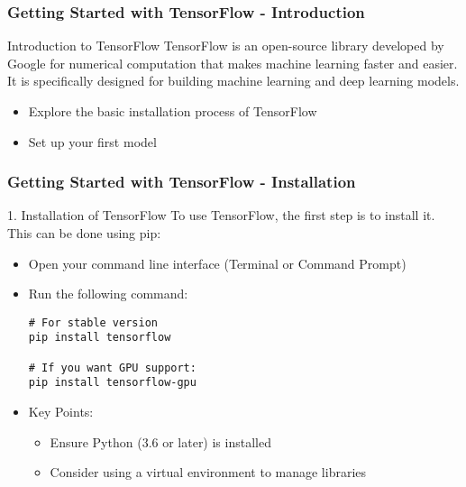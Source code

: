 \documentclass{beamer}
\begin{document}
\begin{frame}[fragile]
    \frametitle{Getting Started with TensorFlow - Introduction}
    \begin{block}{Introduction to TensorFlow}
        TensorFlow is an open-source library developed by Google for numerical computation that makes machine learning faster and easier. It is specifically designed for building machine learning and deep learning models.
    \end{block}
    \begin{itemize}
        \item Explore the basic installation process of TensorFlow
        \item Set up your first model
    \end{itemize}
\end{frame}

\begin{frame}[fragile]
    \frametitle{Getting Started with TensorFlow - Installation}
    \begin{block}{1. Installation of TensorFlow}
        To use TensorFlow, the first step is to install it. This can be done using pip:
    \end{block}
    \begin{itemize}
        \item Open your command line interface (Terminal or Command Prompt)
        \item Run the following command:
            \begin{lstlisting}
# For stable version
pip install tensorflow

# If you want GPU support:
pip install tensorflow-gpu
            \end{lstlisting}
        \item Key Points:
        \begin{itemize}
            \item Ensure Python (3.6 or later) is installed
            \item Consider using a virtual environment to manage libraries
        \end{itemize}
    \end{itemize}
\end{frame}
\end{document}
